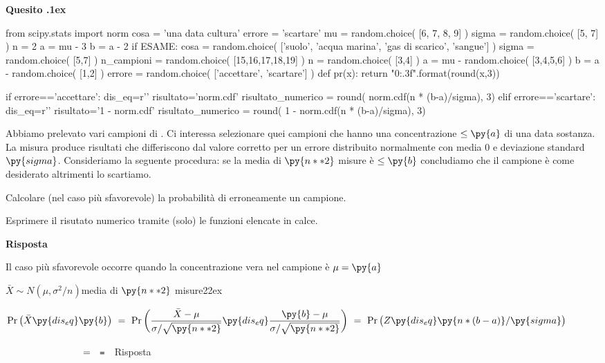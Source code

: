 \documentclass[11pt,twoside,a4paper]{article}
\def\Pr{{\rm Pr\,}}
\newcounter{quesito}
\newenvironment{question}{\addtocounter{quesito}{1}\bigskip\bigskip\par\textbf{Quesito \thequesito.\kern1ex}}{\vspace{\parskip}}
\newenvironment{answer}{\par\textbf{Risposta\quad}}{\vspace{\parskip}}
\begin{document}
\clearpage
\begin{question} %
\begin{pycode}
from scipy.stats import norm
cosa = 'una data cultura'
errore = 'scartare'
mu    = random.choice( [6, 7, 8, 9] )
sigma = random.choice( [5, 7] )
n = 2
a = mu - 3 
b = a - 2
if ESAME:
    cosa = random.choice( ['suolo', 'acqua marina', 'gas di scarico', 'sangue'] )
    sigma = random.choice( [5,7] )
    n_campioni = random.choice( [15,16,17,18,19] )
    n = random.choice( [3,4] )
    a = mu - random.choice( [3,4,5,6] )
    b = a - random.choice( [1,2] )
    errore =  random.choice( ['accettare', 'scartare'] )
def pr(x):
    return "{0:.3f}".format(round(x,3))

if errore=='accettare':
    dis_eq=r'\le'
    risultato='norm.cdf'
    risultato_numerico = round( norm.cdf(n * (b-a)/sigma), 3)
elif errore=='scartare':
    dis_eq=r'\ge'
    risultato='1 - norm.cdf'
    risultato_numerico = round( 1 -  norm.cdf(n * (b-a)/sigma), 3)
    
\end{pycode}
Abbiamo prelevato vari campioni di . Ci interessa selezionare quei campioni che hanno una concentrazione $\le\py{a}$ di una data sostanza. La misura produce risultati che differiscono dal valore corretto per un errore distribuito normalmente con media $0$ e deviazione standard $\py{sigma}$. Consideriamo la seguente procedura: se la media di $\py{n**2}$ misure è $\le\py{b}$ concludiamo che il campione è come desiderato altrimenti lo scartiamo.

Calcolare (nel caso più sfavorevole) la probabilità di  erroneamente un campione.

Esprimere il risutato numerico tramite (solo) le funzioni elencate in calce.
\begin{answer}

Il caso più sfavorevole occorre quando la concentrazione vera nel campione è $\mu=\py{a}$ 


$\bar X\sim N(\mu,\sigma^2/n)$\hfill media di $\py{n**2}$ misure\kern22ex

$\displaystyle\Pr\big(\bar X\py{dis_eq}\py{b}\big)\ =\ \Pr\bigg(\frac{\bar X-\mu}{\sigma/\sqrt{\py{n**2}}}\py{dis_eq}\frac{\py{b}-\mu}{\sigma/\sqrt{\py{n**2}}}\bigg)\ =\  \Pr\big(Z\py{dis_eq}\py{n * (b-a) } /\py{sigma} \big)$

$\phantom{\Pr\big(\bar X\le\py{b}\big)}\ =\ ${}{\tt\ =\  }\hfill {\color{blue}\hfill Risposta}

\end{answer}
\end{question}
\end{document}
